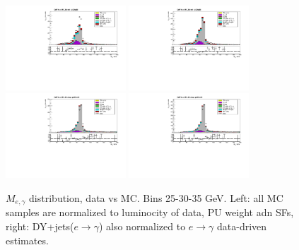 \begin{figure}[htb]
\begin{center}
    \includegraphics[width=0.40\textwidth]{../figs/figs_v11/ELECTRON_WGamma/PrepareYields/c_TotalDATAvsMC_Barrel__Mpholep1PRELIMINARY_FOR_E_TO_GAMMA_WITH_PSV_CUT_pt30to35_.pdf} \includegraphics[width=0.40\textwidth]{../figs/figs_v11/ELECTRON_WGamma/PrepareYields/c_TotalDATAvsMC_Barrel__Mpholep1PRELIMINARY_FOR_E_TO_GAMMA_WITH_PSV_CUT_pt30to35__etogScale.pdf}   \\
    \includegraphics[width=0.40\textwidth]{../figs/figs_v11/ELECTRON_WGamma/PrepareYields/c_TotalDATAvsMC_Endcap__Mpholep1PRELIMINARY_FOR_E_TO_GAMMA_WITH_PSV_CUT_pt30to35_.pdf} \includegraphics[width=0.40\textwidth]{../figs/figs_v11/ELECTRON_WGamma/PrepareYields/c_TotalDATAvsMC_Endcap__Mpholep1PRELIMINARY_FOR_E_TO_GAMMA_WITH_PSV_CUT_pt30to35__etogScale.pdf}\\
   \label{fig:Mpholep1DatavsMC_25to35}
  \caption{$M_{e,\gamma}$ distribution, data vs MC. Bins 25-30-35 GeV. Left: all MC samples are normalized to luminocity of data, PU weight adn SFs, right: DY+jets($e\rightarrow\gamma$) also normalized to $e\rightarrow\gamma$ data-driven estimates.}
  \end{center}
\end{figure}

